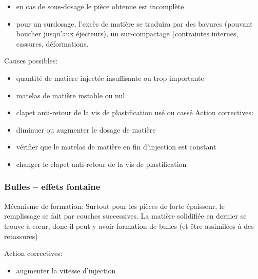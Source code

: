 \documentclass[11pt,oneside]{article}
\begin{document}
\begin{itemize}
 \item en cas de sous-dosage le pièce obtenue est incomplète 
 \item pour un surdosage, l’excès de matière se traduira par des bavures
(pouvant boucher jusqu’aux  éjecteurs),  un  sur-compactage  (contraintes 
internes, cassures, déformations. 
\end{itemize}
       Causes possibles: 
\begin{itemize}
 \item quantité de matière injectée insuffisante ou trop importante 
 \item matelas de matière instable ou nul 
 \item clapet anti-retour de la vis de plastification usé ou cassé 
       Action correctives: 
 \item diminuer ou augmenter le dosage de matière 
 \item vérifier que le matelas de matière en fin d'injection est constant 
       
 \item changer le clapet anti-retour de la vis de plastification 
\end{itemize}
 \subsubsection{Bulles – effets fontaine}
         
        Mécanisme de formation: 
        Surtout  pour  les  pièces  de  forte  épaisseur,  le  remplissage  se 
fait  par  couches 
successives. La matière solidifiée en dernier se trouve à cœur, donc il peut y
avoir formation 
de bulles (et être assimilées à des retassures) 
         
        Action correctives: 
\begin{itemize}
 \item augmenter la vitesse d’injection 
\end{itemize}
 
\end{document}
